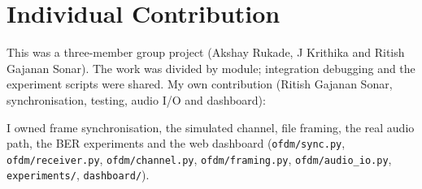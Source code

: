 \documentclass[11pt,a4paper]{report}
\begin{document}
\chapter{Individual Contribution}

This was a three-member group project (Akshay Rukade, J Krithika and Ritish Gajanan Sonar). The work was divided by module;
integration debugging and the experiment scripts were shared. My own contribution
(Ritish Gajanan Sonar, synchronisation, testing, audio I/O and dashboard):

{\sloppy
I owned frame synchronisation, the simulated channel, file framing, the real audio
path, the BER experiments and the web dashboard (\texttt{ofdm/sync.py},
\texttt{ofdm/receiver.py}, \texttt{ofdm/channel.py}, \texttt{ofdm/framing.py},
\texttt{ofdm/audio\_io.py}, \texttt{experiments/}, \texttt{dashboard/}).\par}
\end{document}
